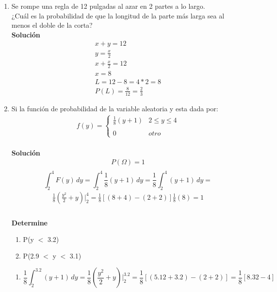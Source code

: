 \begin{enumerate}
	\item Se rompe una regla de 12 pulgadas al azar en 2 partes a lo largo.\\
	¿Cuál es la probabilidad de que la longitud de la parte más larga sea al menos el doble de la corta?
    \\\textbf{Solución}
    \begin{gather*}
        x + y = 12\\
        y = \frac{x}{2}\\
        x + \frac{x}{2} = 12\\
        x = 8\\
        L = 12 - 8 = 4*2 = 8\\
        P(L)=\frac{8}{12}=\frac{2}{3}
    \end{gather*}
	\item Si la función de probabilidad de la variable aleatoria y esta dada por:
	\begin{gather*}
	    f(y)= \left\{ \begin{array}{lcc}
             \frac{1}{8}(y+1) & 2 \leq y \leq 4\\
             \\ 0 & otro 
             \end{array}
   \right.
	\end{gather*}
    \\\textbf{Solución}
    \\
    \begin{gather*}
        P(\Omega)=1\\ 
    \end{gather*}
       \[ \int_{2}^{4}  \! F(y) \, dy =
        \int_{2}^{4}  \! \frac{1}{8}(y+1) \, dy =\frac{1}{8}\int_{2}^{4}  \! (y+1) \, dy = 
        \]
    \begin{gather*}
    \frac{1}{8}(\frac{y^2}{2}+y)|_2^4 =
        \frac{1}{8}[(8+4)-(2+2)]\frac{1}{8}(8)=1 \\
    \end{gather*}
\\\textbf{Determine}\\
     \begin{enumerate}
           \item P(y $<$ 3.2)\\
            \item P(2.9 $<$ y $<$ 3.1)
        \end{enumerate}
      \begin{enumerate}
           \item  \[\frac{1}{8}\int_{2}^{3.2}  \! (y+1) \, dy =\frac{1}{8}(\frac{y^2}{2}+y)|_2^3.2 = \frac{1}{8}[(5.12+3.2)-(2+2)]=\frac{1}{8}[8.32-4]
\]
\end{enumerate}
\end{enumerate}
